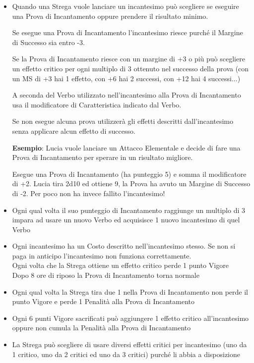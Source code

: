 \documentclass[12pt,a4paper,twoside,openany]{book}
\begin{document}
\begin{multicols}{2}
\begin{itemize}
\item 
Quando una Strega vuole lanciare un incantesimo può scegliere se eseguire una Prova di Incantamento oppure prendere il risultato minimo.

Se esegue una Prova di Incantamento l'incantesimo riesce purché il Margine di Successo sia entro -3.

Se la Prova di Incantamento riesce con un margine di +3 o più può scegliere un effetto critico per ogni multiplo di 3 ottenuto nel successo della prova (con un MS di +3 hai 1 effetto, con +6 hai 2 successi, con +12 hai 4 successi...)

A seconda del Verbo utilizzato nell'incantesimo alla Prova di Incantamento usa il modificatore di Caratteristica indicato dal Verbo.

Se non esegue alcuna prova utilizzerà gli effetti descritti dall'incantesimo senza applicare alcun effetto di successo.

\textbf{Esempio}: Lucia vuole lanciare un Attacco Elementale e decide di fare una Prova di Incantamento per sperare in un risultato migliore.

Esegue una Prova di Incantamento (ha punteggio 5) e somma il modificatore di +2.
Lucia tira 2d10 ed ottiene 9, la Prova ha avuto un Margine di Successo di -2. Per poco non ha invece fallito l'incantesimo!

\item 

Ogni qual volta il suo punteggio di Incantamento raggiunge un multiplo di 3 impara ad usare un nuovo Verbo ed acquisisce 1 nuovo incantesimo di quel Verbo

\item 
Ogni incantesimo ha un Costo descritto nell'incantesimo stesso. Se non si paga in anticipo l'incantesimo non funziona correttamente.\\
Ogni volta che la Strega ottiene un effetto critico perde 1 punto Vigore\\
Dopo 8 ore di riposo la Prova di Incantamento torna normale

\item 
Ogni qual volta la Strega tira due 1 nella Prova di Incantamento non perde il punto Vigore e perde 1 Penalità alla Prova di Incantamento

\item 
Ogni 6 punti Vigore sacrificati può aggiungere 1 effetto critico all'incantesimo oppure non cumula la Penalità alla Prova di Incantamento

\item 
La Strega può scegliere di usare diversi effetti critici per incantesimo (uno da 1 critico, uno da 2 critici ed uno da 3 critici) purché li abbia a disposizione


\end{itemize}
\end{multicols}
\end{document}
